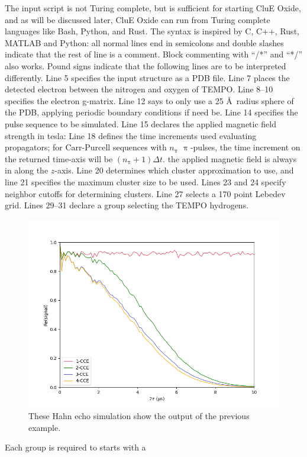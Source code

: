 \documentclass{book}
\begin{document}
The input script is not Turing complete, 
but is sufficient for starting CluE Oxide,
and as will be discussed later, CluE Oxide 
can run from Turing complete languages
like Bash, Python, and Rust.
The syntax is inspired by C, C++, Rust, MATLAB and Python:
all normal lines end in semicolons and double slashes indicate that the rest of 
line is a comment.  Block commenting with ``/*'' and ``*/'' also works. 
Pound signs indicate that the following lines are to be interpreted differently.
Line 5 specifies the input structure as a PDB file.  
Line 7 places the detected electron between the nitrogen and oxygen of TEMPO.
Line 8--10 specifies the electron g-matrix.
Line 12 says to only use a 25 \AA~radius sphere of the PDB, 
applying periodic boundary conditions if need be.
Line 14 specifies the pulse sequence to be simulated.
Line 15 declares the applied magnetic field strength in tesla: 
Line 18 defines the time increments used evaluating propagators; 
for Carr-Purcell sequences with $n_{\uppi}$ $\uppi$-pulses, 
the time increment on the returned time-axis will be $(n_{\uppi}+1)\Delta t$.  
the applied magnetic field is always in along the $z$-axis.
Line 20 determines which cluster approximation to use, 
and line 21 specifies the maximum cluster size to be used.
Lines 23 and 24 specify neighbor cutoffs for determining clusters.
Line 27 selects a 170 point Lebedev grid\cite{1999_Lebedev}.
Lines 29--31 declare a group selecting the TEMPO hydrogens.
%
\begin{figure} [H]
	\centering
	\includegraphics[width=0.75\linewidth]{figs/fig_CluE-sims_n-CCE.png}
  \caption{These Hahn echo simulation show the output of the previous example.
  }
  \label{fig:example_ncce}
\end{figure}
%
%
Each group is required to starts with a 
\end{document}
